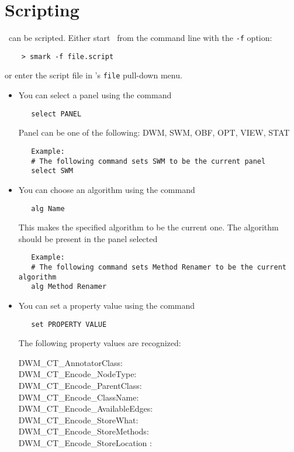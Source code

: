 \section{Scripting \SM}
\SM\ can be scripted. Either start \SM\ from the command line
with the {\tt -f} option:
\begin{verbatim}
    > smark -f file.script
\end{verbatim}
or enter the script file in \SM's {\tt file} pull-down
menu.

\begin{itemize}
  \item You can select a panel using the command
\begin{verbatim}
   select PANEL      
\end{verbatim}
  Panel can be one of the following: DWM, SWM, OBF, OPT, VIEW, STAT 
 \begin{verbatim}
   Example:
   # The following command sets SWM to be the current panel
   select SWM
\end{verbatim}
\item You can choose an algorithm using the command
\begin{verbatim}
   alg Name      
\end{verbatim}
  This makes the specified algorithm to be the current one. The algorithm should be present in the panel selected
 \begin{verbatim}
   Example: 
   # The following command sets Method Renamer to be the current algorithm
   alg Method Renamer
\end{verbatim}
  \item You can set a property value using the command
\begin{verbatim}
   set PROPERTY VALUE       
\end{verbatim}
      The following property values are recognized:
      \begin{description}
          \item[DWM\_CT\_AnnotatorClass:]         
          \item[DWM\_CT\_Encode\_NodeType:]
          \item[DWM\_CT\_Encode\_ParentClass:]      
          \item[DWM\_CT\_Encode\_ClassName:]
          \item[DWM\_CT\_Encode\_AvailableEdges:]   
          \item[DWM\_CT\_Encode\_StoreWhat:]
          \item[DWM\_CT\_Encode\_StoreMethods:]    
          \item[DWM\_CT\_Encode\_StoreLocation :]    

\end{description}
\end{itemize}
